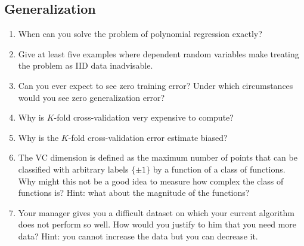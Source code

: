 \documentclass{article}
\begin{document}
\subsection{Generalization}
\begin{enumerate}
\item When can you solve the problem of polynomial regression exactly?

\item Give at least five examples where dependent random variables make treating the problem as IID data inadvisable.

\item Can you ever expect to see zero training error? Under which circumstances would you see zero generalization error?

\item Why is $K$-fold cross-validation very expensive to compute?

\item Why is the $K$-fold cross-validation error estimate biased?

\item The VC dimension is defined as the maximum number of points that can be classified with arbitrary labels $\{\pm 1\}$ by a function of a class of functions. Why might this not be a good idea to measure how complex the class of functions is? Hint: what about the magnitude of the functions?

\item Your manager gives you a difficult dataset on which your current algorithm does not perform so well. How would you justify to him that you need more data? Hint: you cannot increase the data but you can decrease it.
\end{enumerate}
\end{document}
